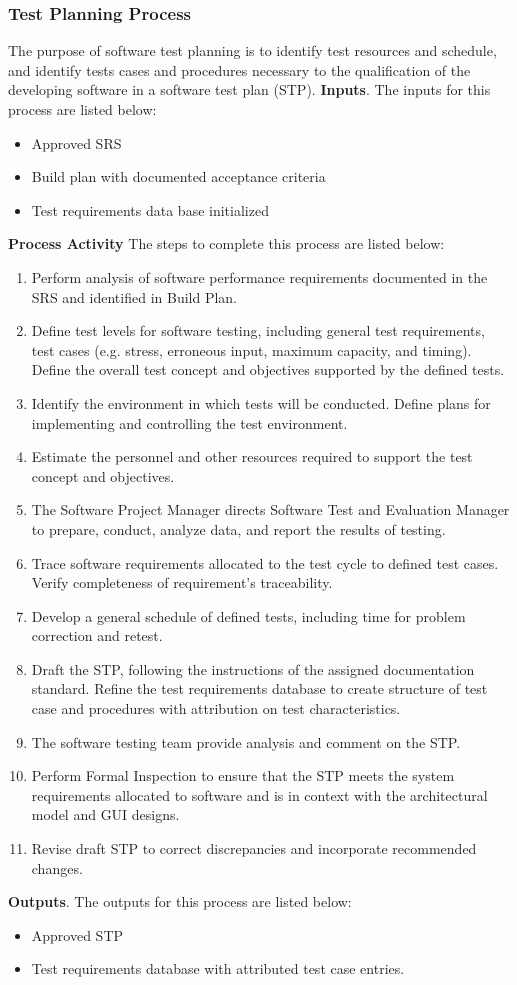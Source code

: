 \documentclass[a4paper, 11pt]{article}
\begin{document}
\subsubsection{Test Planning Process}\label{test}
The purpose of software test planning is to identify test resources and schedule, and identify tests cases and procedures necessary to the qualification of the developing software in a software test plan (STP).
\textbf{Inputs}. The inputs for this process are listed below:
\begin{itemize}
	\item Approved SRS
	\item Build plan with documented acceptance criteria
	\item Test requirements data base initialized
\end{itemize}
\textbf{Process Activity} The steps to complete this process are listed below:
\begin{enumerate}
	\item Perform analysis of software performance requirements documented in the SRS and identified in Build Plan.
	\item Define test levels for software testing, including general test requirements, test cases (e.g.	stress, erroneous input, maximum capacity, and timing). Define the overall test concept and objectives supported by the defined tests.
	\item Identify the environment in which tests will be conducted. Define plans for implementing and controlling the test environment.
	\item Estimate the personnel and other resources required to support the test concept and objectives.
	\item The Software Project Manager directs Software Test and Evaluation Manager to prepare, conduct, analyze data, and report the results of testing.
	\item Trace software requirements allocated to the test cycle to defined test cases. Verify completeness of requirement's traceability.
	\item Develop a general schedule of defined tests, including time for problem correction and retest.
	\item Draft the STP, following the instructions of the assigned documentation standard. Refine the test requirements database to create structure of test case and procedures with attribution on test characteristics.
	\item The software testing team provide analysis and comment on the STP.
	\item Perform Formal Inspection to ensure that the STP meets the system requirements	allocated to software and is in context with the architectural model and GUI designs.
	\item Revise draft STP to correct discrepancies and incorporate recommended changes.
\end{enumerate}
\textbf{Outputs}. The outputs for this process are listed below:
\begin{itemize}
	\item Approved STP
	\item Test requirements database with attributed test case entries.
\end{itemize}
\end{document}
